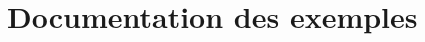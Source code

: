 \documentclass[twoside]{book}
\newcommand{\+}{\discretionary{\mbox{\scriptsize$\hookleftarrow$}}{}{}}
\newcommand{\clearemptydoublepage}{%
    \newpage{\pagestyle{empty}\cleardoublepage}%
  }
\begin{document}
\chapter{Documentation des exemples}

  \backmatter
  \newpage
  \clearemptydoublepage
  \printindex
\end{document}
